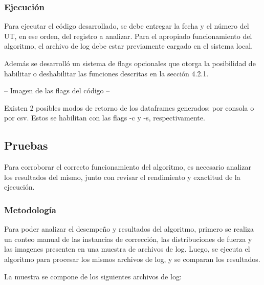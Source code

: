 \subsubsection{Ejecución}

Para ejecutar el código desarrollado, se debe entregar la fecha y el número del UT, en ese orden, del registro a analizar. Para el apropiado funcionamiento del algoritmo, el archivo de log debe estar previamente cargado en el sistema local.

Además se desarrolló un sistema de flags opcionales que otorga la posibilidad de habilitar o deshabilitar las funciones descritas en la sección 4.2.1.

-- Imagen de las flags del código --

Existen 2 posibles modos de retorno de los dataframes generados: por consola o por csv. Estos se habilitan con las flags -c y -s, respectivamente.

\subsection{Pruebas}

Para corroborar el correcto funcionamiento del algoritmo, es necesario analizar los resultados del mismo, junto con revisar el rendimiento y exactitud de la ejecución.

\subsubsection{Metodología}

Para poder analizar el desempeño y resultados del algoritmo, primero se realiza un conteo manual de las instancias de corrección, las distribuciones de fuerza y las imagenes presenten en una muestra de archivos de log. Luego, se ejecuta el algoritmo para procesar los mismos archivos de log, y se comparan los resultados. 

La muestra se compone de los siguientes archivos de log:

